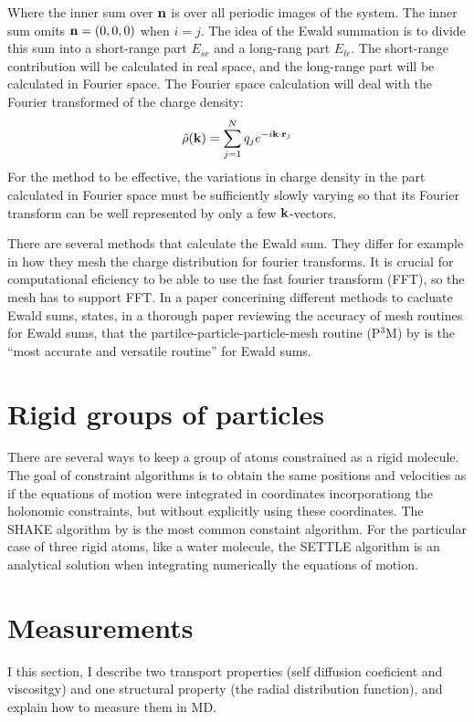 Where the inner sum over $\mathbf{n}$ is over all periodic images of the system. The inner sum omits $\mathbf{n} = (0, 0, 0)$ when $i=j$. The idea of the Ewald summation is to divide this sum into a short-range part $E_{sr}$ and a long-rang part $E_{lr}$. The short-range contribution will be calculated in real space, and the long-range part will be calculated in Fourier space. The Fourier space calculation will deal with the Fourier transformed of the charge density:
\begin{equation}
	\tilde{\rho}(\mathbf{k}) = \sum_{j=1}^N q_j e^{-i\mathbf{k}\cdot \mathbf{r}_j}
\end{equation}
For the method to be effective, the variations in charge density in the part calculated in Fourier space must be sufficiently slowly varying so that its Fourier transform can be well represented by only a few $\mathbf{k}$-vectors.

There are several methods that calculate the Ewald sum. They differ for example in how they mesh the charge distribution for fourier transforms. It is crucial for computational eficiency to be able to use the fast fourier transform (FFT), so the mesh has to support FFT. In a paper concerining different methods to cacluate Ewald sums, \citet{Deserno1998} states, in a thorough paper reviewing the accuracy of mesh routines for Ewald sums, that the partilce-particle-particle-mesh routine (P$^3$M) by \citet{Hockney:1988:CSU:62815} is the ``most accurate and versatile routine'' for Ewald sums. 

\section{Rigid groups of particles}
There are several ways to keep a group of atoms constrained as a rigid molecule. The goal of constraint algorithms is to obtain the same positions and velocities as if the equations of motion were integrated in coordinates incorporationg the holonomic constraints, but without explicitly using these coordinates. The SHAKE algorithm by \citet{Ryckaert1977} is the most common constaint algorithm. For the particular case of three rigid atoms, like a water molecule, the SETTLE algorithm \cite{Miyamoto1992} is an analytical solution when integrating numerically the equations of motion.
\label{sec:shake}

\section{Measurements}
I this section, I describe two transport properties (self diffusion coeficient and viscositgy) and one structural property (the radial distribution function), and explain how to measure them in MD.

